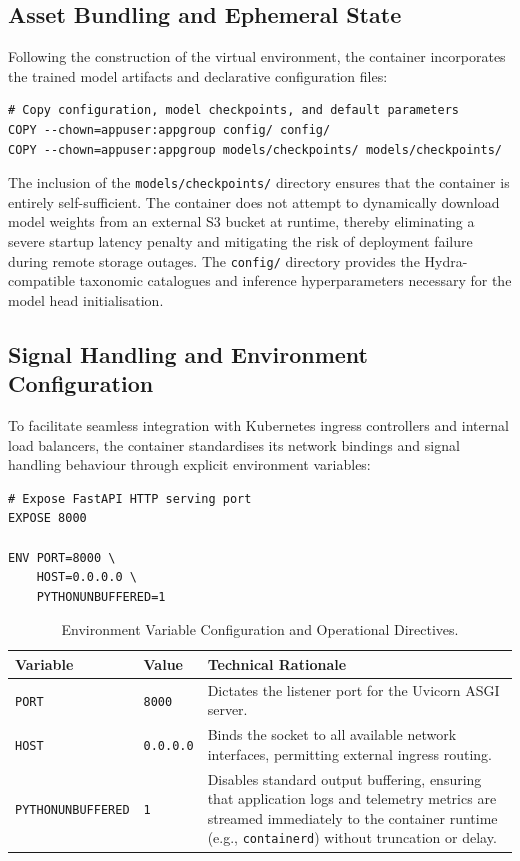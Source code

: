 \subsection{Asset Bundling and Ephemeral State}

Following the construction of the virtual environment, the container incorporates the trained model artifacts and declarative configuration files:

\begin{verbatim}
# Copy configuration, model checkpoints, and default parameters
COPY --chown=appuser:appgroup config/ config/
COPY --chown=appuser:appgroup models/checkpoints/ models/checkpoints/
\end{verbatim}

The inclusion of the \texttt{models/checkpoints/} directory ensures that the container is entirely self-sufficient. The container does not attempt to dynamically download model weights from an external S3 bucket at runtime, thereby eliminating a severe startup latency penalty and mitigating the risk of deployment failure during remote storage outages. The \texttt{config/} directory provides the Hydra-compatible taxonomic catalogues and inference hyperparameters necessary for the model head initialisation.

\subsection{Signal Handling and Environment Configuration}

To facilitate seamless integration with Kubernetes ingress controllers and internal load balancers, the container standardises its network bindings and signal handling behaviour through explicit environment variables:

\begin{verbatim}
# Expose FastAPI HTTP serving port
EXPOSE 8000

ENV PORT=8000 \
    HOST=0.0.0.0 \
    PYTHONUNBUFFERED=1
\end{verbatim}

\begin{table}[htbp]
\centering
\caption{Environment Variable Configuration and Operational Directives.}
\label{tab:env_vars}
\begin{tabularx}{\textwidth}{@{}l l X@{}}
\toprule
\textbf{Variable} & \textbf{Value} & \textbf{Technical Rationale} \\
\midrule
\texttt{PORT} & \texttt{8000} & Dictates the listener port for the Uvicorn ASGI server. \\
\texttt{HOST} & \texttt{0.0.0.0} & Binds the socket to all available network interfaces, permitting external ingress routing. \\
\texttt{PYTHONUNBUFFERED} & \texttt{1} & Disables standard output buffering, ensuring that application logs and telemetry metrics are streamed immediately to the container runtime (e.g., \texttt{containerd}) without truncation or delay. \\
\bottomrule
\end{tabularx}
\end{table}

